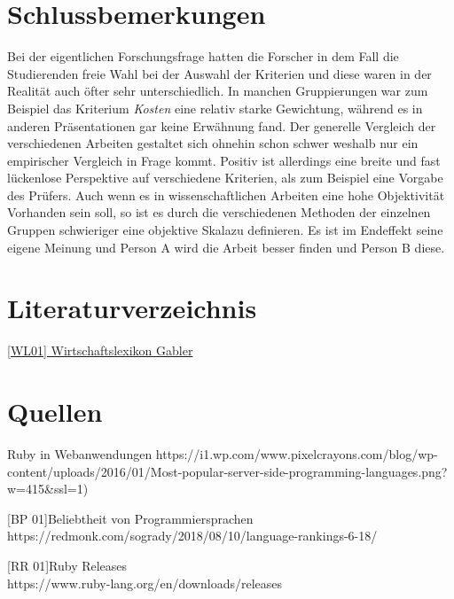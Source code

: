 \documentclass[12pt,DIV=14, version=first, BCOR=10mm,a4paper,twoside,parskip=half-,headsepline,headinclude]{scrartcl}
\begin{document}
\section{Schlussbemerkungen}
\begin{flushleft}
Bei der eigentlichen Forschungsfrage hatten die Forscher in dem Fall die Studierenden freie Wahl bei der Auswahl der Kriterien und diese waren in der Realität auch öfter sehr unterschiedlich. In manchen Gruppierungen war zum Beispiel das Kriterium \textit{Kosten} eine relativ starke Gewichtung, während es in anderen Präsentationen gar keine Erwähnung fand. Der generelle Vergleich der verschiedenen Arbeiten gestaltet sich ohnehin schon schwer weshalb nur ein empirischer Vergleich in Frage kommt. Positiv ist allerdings eine breite und fast lückenlose Perspektive auf verschiedene Kriterien, als zum Beispiel eine Vorgabe des Prüfers. Auch wenn es in wissenschaftlichen Arbeiten eine hohe Objektivität Vorhanden sein soll, so ist es durch die verschiedenen Methoden der einzelnen Gruppen schwieriger eine \glqq objektive Skala\grqq zu definieren. Es ist im Endeffekt seine eigene Meinung und Person A wird die Arbeit besser finden und Person B diese.
\end{flushleft}
\pagebreak

\section{Literaturverzeichnis}
\begin{flushleft}
\href{https://wirtschaftslexikon.gabler.de/definition/objektorientierung-43907} {[WL01] Wirtschaftslexikon Gabler}
\end{flushleft}

\section{Quellen}
\begin{flushleft}
[RW 01]Ruby in Webanwendungen
https://i1.wp.com/www.pixelcrayons.com/blog/wp-content/uploads/2016/01/Most-popular-server-side-programming-languages.png?w=415{\&}ssl=1)

[BP 01]Beliebtheit von Programmiersprachen
https://redmonk.com/sogrady/2018/08/10/language-rankings-6-18/

[RR 01]Ruby Releases\\
https://www.ruby-lang.org/en/downloads/releases
\end{flushleft}


%
\end{document}
